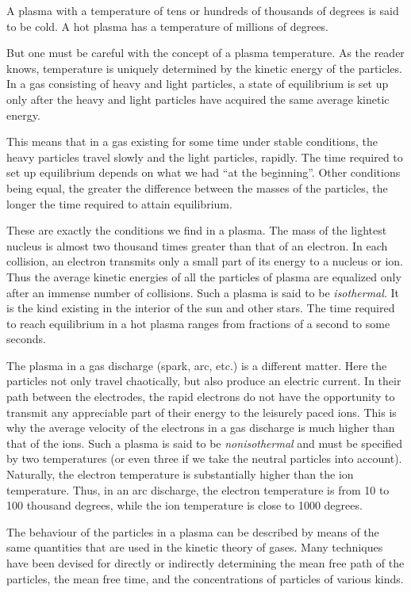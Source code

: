 A plasma with a temperature of tens or hundreds of thousands of degrees is said to be cold. A hot plasma has a temperature of millions of degrees.

But one must be careful with the concept of a plasma temperature. As the reader knows, temperature is uniquely determined by the kinetic energy of the particles. In a gas consisting of heavy and light particles, a state of equilibrium is set up only after the heavy and light particles have acquired the same average kinetic energy.

This means that in a gas existing for some time under stable conditions, the heavy particles travel slowly and the light particles, rapidly. The time required to set up equilibrium depends on what we had ``at the beginning''. Other conditions being equal, the greater the difference between the masses of the particles, the longer the time required to attain equilibrium.

These are exactly the conditions we find in a plasma. The mass of the lightest nucleus is almost two thousand times greater than that of an electron. In each collision, an electron transmits only a small part of its energy to a nucleus or ion. Thus the average kinetic energies of all the particles of plasma are equalized only after an immense number of collisions. Such a plasma is said to be \emph{isothermal}. It is the kind existing in the interior of the sun and other stars. The time required to reach equilibrium in a hot plasma ranges from fractions of a second to some seconds.

The plasma in a gas discharge (spark, arc, etc.) is a different matter. Here the particles not only travel chaotically, but also produce an electric current. In their path between the electrodes, the rapid electrons do not have the opportunity to transmit any appreciable part of their energy to the leisurely paced ions. This is why the average velocity of the electrons in a gas discharge is much higher than that of the ions. Such a plasma is said to be \emph{nonisothermal} and must be specified by two temperatures (or even three if we take the neutral particles into account). Naturally, the electron temperature is substantially higher than the ion temperature. Thus, in an arc discharge, the electron temperature is from 10 to 100 thousand degrees, while the ion temperature is close to 1000 degrees.

The behaviour of the particles in a plasma can be described by means of the same quantities that are used in the kinetic theory of gases. Many techniques have been devised for directly or indirectly determining the mean free path of the particles, the mean free time, and the concentrations of particles of various kinds.

